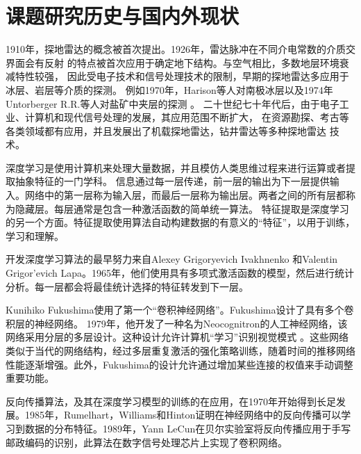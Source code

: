 \section{课题研究历史与国内外现状}
1910年，探地雷达的概念被首次提出。1926年，雷达脉冲在不同介电常数的介质交界面会有反射
的特点被首次应用于确定地下结构。与空气相比，多数地层环境衰减特性较强，
因此受电子技术和信号处理技术的限制，早期的探地雷达多应用于冰层、岩层等介质的探测。
例如1970年，Harison等人对南极冰层以及1974年Untorberger R.R.等人对盐矿中夹层的探测
。
二十世纪七十年代后，由于电子工业、计算机和现代信号处理的发展，其应用范围不断扩大，
在资源勘探、考古等各类领域都有应用，并且发展出了机载探地雷达，钻井雷达等多种探地雷达
技术。

深度学习是使用计算机来处理大量数据，并且模仿人类思维过程来进行运算或者提取抽象特征的一门学科。
信息通过每一层传递，前一层的输出为下一层提供输入。网络中的第一层称为输入层，而最后一层称为输出层。两者之间的所有层都称为隐藏层。每层通常是包含一种激活函数的简单统一算法。
特征提取是深度学习的另一个方面。特征提取使用算法自动构建数据的有意义的“特征”，以用于训练，学习和理解。


开发深度学习算法的最早努力来自Alexey Grigoryevich Ivakhnenko 和Valentin Grigor'evich Lapa。1965年，他们使用具有多项式激活函数的模型，然后进行统计分析。每一层都会将最佳统计选择的特征转发到下一层。

Kunihiko Fukushima使用了第一个“卷积神经网络”。Fukushima设计了具有多个卷积层的神经网络。 1979年，他开发了一种名为Neocognitron的人工神经网络，该网络采用分层的多层设计。这种设计允许计算机“学习”识别视觉模式
。这些网络类似于当代的网络结构，经过多层重复激活的强化策略训练，随着时间的推移网络性能逐渐增强。此外，Fukushima的设计允许通过增加某些连接的权值来手动调整重要功能。

反向传播算法，及其在深度学习模型的训练的在应用，在1970年开始得到长足发展。1985年，Rumelhart，Williams和Hinton证明在神经网络中的反向传播可以学习到数据的分布特征。1989年，Yann LeCun在贝尔实验室将反向传播应用于手写邮政编码的识别，此算法在数字信号处理芯片上实现了卷积网络。

